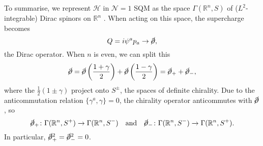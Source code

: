 To summarise, we represent $\mathscr{H}$ in $\mathcal{N} = 1$ SQM as the space $\Gamma(\mathbb{R}^n, S)$  of ($L^2$-integrable) Dirac spinors on $\mathbb{R}^n$ . When acting on this space, the supercharge becomes
\begin{equation}
  Q = i \psi^a p_a \to \cancel{\partial},
\end{equation}
the Dirac operator.
When $n$  is even, we can split this 
\begin{equation}
  \cancel{\partial} = \cancel{\partial} \left( \frac{1 + \gamma}{2} \right) + \cancel{\partial} \left( \frac{1 - \gamma}{2} \right) = \cancel{\partial}_+ + \cancel{\partial}_-, 
\end{equation}
where the $\frac{1}{2}( 1 \pm \gamma)$ project onto $S^{\pm}$, the spaces of definite chirality.
Due to the anticommutation relation $\{\gamma^a, \gamma\} = 0$, the chirality operator anticommutes with $\cancel{\partial}$, so
\begin{equation}
  \cancel{\partial}_+ \colon \Gamma(\mathbb{R}^n, S^+) \to \Gamma(\mathbb{R}^n, S^-) \quad \text{and} \quad \cancel{\partial}_- \colon \Gamma(\mathbb{R}^n, S^-) \to \Gamma(\mathbb{R}^n, S^+).
\end{equation}
In particular, $\cancel{\partial}^2_+ = \cancel{\partial}_-^2 = 0$.

